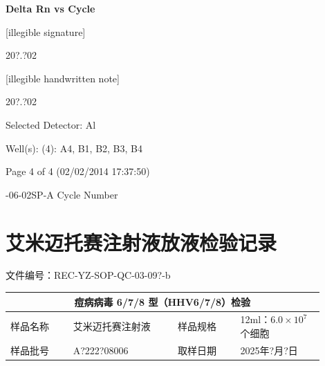 \documentclass[UTF8,10pt,a4paper,fontset=fandol]{ctexart}
\newcommand{\fieldvalue}[1]{#1}
\newcommand{\handwritten}[1]{#1}
\begin{document}
\begin{center}
\textbf{Delta Rn vs Cycle}

\vspace{0.5em}


\vspace{0.5em}

\begin{flushright}
\handwritten{[illegible signature]}

\handwritten{20?.?02}

\handwritten{[illegible handwritten note]}

\handwritten{20?.?02}
\end{flushright}

\vfill

\noindent
Selected Detector: Al

\noindent
Well(s): (4): A4, B1, B2, B3, B4

\noindent
Page 4 of 4 (02/02/2014 17:37:50)

-06-02SP-A \hfill Cycle Number
\end{center}

\newpage

\section*{艾米迈托赛注射液放液检验记录}

\noindent
文件编号：REC-YZ-SOP-QC-03-09?-b

\begin{center}
\begin{tabular}{|p{0.18\linewidth}|p{0.30\linewidth}|p{0.18\linewidth}|p{0.24\linewidth}|}
\hline
\multicolumn{4}{|c|}{\textbf{痘病病毒 6/7/8 型（HHV6/7/8）检验}}\\
\hline
样品名称 & 艾米迈托赛注射液 & 样品规格 & 12ml：$6.0\times10^7$个细胞\\
\hline
样品批号 &
\fieldvalue{\handwritten{A?222?08006}}
&
取样日期 &
\fieldvalue{\handwritten{2025年?月?日}}
\\
\hline
\end{tabular}
\end{center}
\end{document}
